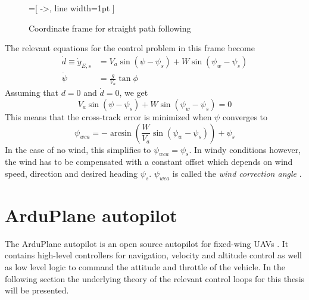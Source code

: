 \begin{figure}[H]
    \begin{center}
        =[
            ->,
            line width=1pt
            ]
    \end{center}
    \caption{Coordinate frame for straight path following}
    \label{fig:coord_straight}
\end{figure}

The relevant equations for the control problem in this frame become
\begin{align}
    \dot{d}\equiv\dot{y}_{E,s} &= V_a\sin(\psi-\psi_s) + W\sin(\psi_w-\psi_s)\\
    \dot{\psi} &= \frac{g}{V_a}\tan\phi
\end{align}
Assuming that $d=0$ and $\dot{d}=0$, we get
\begin{equation}
    V_a\sin(\psi-\psi_s) + W\sin(\psi_w-\psi_s)=0
\end{equation}
This means that the cross-track error is minimized when $\psi$ converges to
\begin{equation}\label{eq:wca}
    \psi_{wca}=-\arcsin\left(\frac{W}{V_a}\sin(\psi_w-\psi_s)\right) + \psi_s
\end{equation}
In the case of no wind, this simplifies to $\psi_{wca}=\psi_s$. In windy conditions however, the wind 
has to be compensated with a constant offset which depends on wind speed, direction and desired 
heading $\psi_s$. $\psi_{wca}$ is called the \textit{wind correction angle} \cite{uav_dynamics_wind}.

\section{ArduPlane autopilot}
The ArduPlane autopilot is an open source autopilot for fixed-wing UAVs \cite{arduplane}. 
It contains high-level controllers for navigation, velocity and altitude control as well as 
low level logic to command the attitude and throttle of the vehicle. In the following section
the underlying theory of the relevant control loops for this thesis will be presented.

